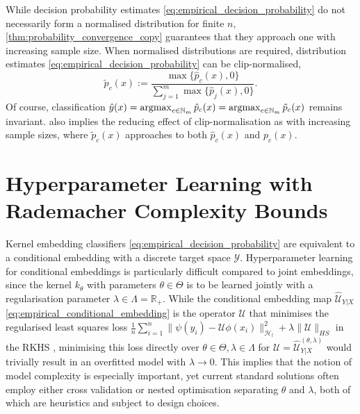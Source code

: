 \documentclass{article}
\newcommand{\argmax}{\operatornamewithlimits{argmax}}
\begin{document}
	While decision probability estimates \eqref{eq:empirical_decision_probability} do not necessarily form a normalised distribution for finite $n$, \cref{thm:probability_convergence_copy} guarantees that they approach one with increasing sample size. When normalised distributions are required, distribution estimates \eqref{eq:empirical_decision_probability} can be clip-normalised,
	\begin{equation}
		\tilde{p}_{c}(x) := \frac{\max\{\hat{p}_{c}(x), 0\}}{\sum_{j = 1}^{m} \max\{\hat{p}_{j}(x), 0\}}.
	\label{eq:empirical_decision_probability_clip_normalised}
	\end{equation}
	Of course, classification $\hat{y}(x) = \argmax_{c \in \mathbb{N}_{m}} \hat{p}_{c}(x) = \argmax_{c \in \mathbb{N}_{m}} \tilde{p}_{c}(x)$ remains invariant.   also implies the reducing effect of clip-normalisation as with increasing sample sizes, where $\tilde{p}_{c}(x)$ approaches to both $\hat{p}_{c}(x)$ and $p_{c}(x)$.
	
\section{Hyperparameter Learning with Rademacher Complexity Bounds}
\label{sec:hyperparameter_learning}

	Kernel embedding classifiers \eqref{eq:empirical_decision_probability} are equivalent to a conditional embedding with a discrete target space $\mathcal{Y}$. Hyperparameter learning for conditional embeddings is particularly difficult compared to joint embeddings, since the kernel $k_{\theta}$ with parameters $\theta \in \Theta$ is to be learned jointly with a regularisation parameter $\lambda \in \Lambda = \mathbb{R}_{+}$. While the conditional embedding map $\hat{\mathcal{U}}_{Y | X}$ \eqref{eq:empirical_conditional_embedding} is the operator $\mathcal{U}$ that minimises the regularised least squares loss $\frac{1}{n} \sum_{i = 1}^{n} \| \psi(y_{i}) - \mathcal{U} \phi(x_{i}) \|_{\mathcal{H}_{l}}^{2} + \lambda \| \mathcal{U} \|_{HS}$ in the RKHS \citep{song2013kernel}, minimising this loss directly over $\theta \in \Theta, \lambda \in \Lambda$ for $\mathcal{U} = \hat{\mathcal{U}}^{(\theta, \lambda)}_{Y | X}$ would trivially result in an overfitted model with $\lambda \rightarrow 0$. This implies that the notion of model complexity is especially important, yet current standard solutions often employ either cross validation or nested optimisation separating $\theta$ and $\lambda$, both of which are heuristics and subject to design choices.
	
\end{document}
